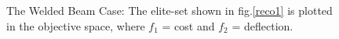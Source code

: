 \begin{figure}[h!]
\begin{minipage}[b]{1\linewidth}
 \centering
\end{minipage}
\caption{The Welded Beam Case: The elite-set shown in fig.\ref{reco1} is plotted in the objective space, where $f_1$ = cost and $f_2$ = deflection.} 
\label{Pareto1}
\end{figure}


